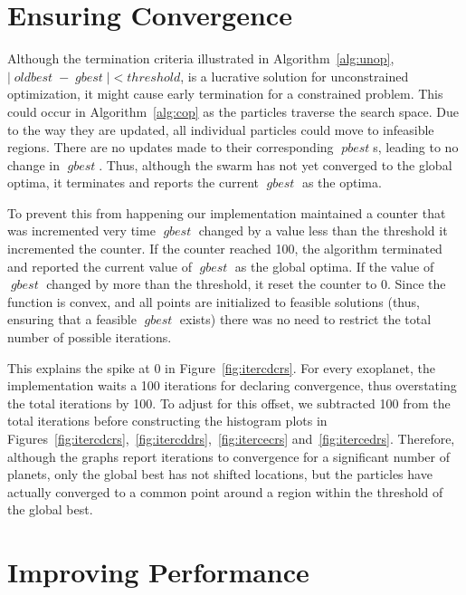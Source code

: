 \documentclass[10pt]{article}
\DeclareMathOperator*{\pbest}{\mathit{pbest}}
\DeclareMathOperator*{\gbest}{\mathit{gbest}}
\DeclareMathOperator*{\oldbest}{\mathit{oldbest}}
\begin{document}
\begin{appendices}

  \pagebreak
  \section{Ensuring Convergence}\label{app:con}

  Although the termination criteria illustrated in Algorithm~\ref{alg:unop}, $|\oldbest-\gbest| < \mathit{threshold}$,
  is a lucrative solution for unconstrained optimization, it might cause early termination for a constrained problem.
  This could occur in Algorithm~\ref{alg:cop} as the particles traverse the search space. Due to the way they are
  updated, all individual particles could move to infeasible regions. There are no updates made to their corresponding
  $\pbest$s, leading to no change in $\gbest$. Thus, although the swarm has not yet converged to the global optima, it
  terminates and reports the current $\gbest$ as the optima.

  To prevent this from happening our implementation maintained a counter that was incremented very time $\gbest$ changed
  by a value less than the threshold it incremented the counter. If the counter reached \num{100}, the algorithm
  terminated and reported the current value of $\gbest$ as the global optima. If the value of $\gbest$ changed by more
  than the threshold, it reset the counter to $\num{0}$. Since the function is convex, and all points are initialized to
  feasible solutions (thus, ensuring that a feasible $\gbest$ exists) there was no need to restrict the total number of
  possible iterations.

  This explains the spike at \num{0} in Figure~\ref{fig:itercdcrs}. For every exoplanet, the implementation waits a
  \num{100} iterations for declaring convergence, thus overstating the total iterations by \num{100}. To adjust for this
  offset, we subtracted \num{100} from the total iterations before constructing the histogram plots in
  Figures~\ref{fig:itercdcrs},~\ref{fig:itercddrs},~\ref{fig:itercecrs} and~\ref{fig:itercedrs}. Therefore, although the
  graphs report iterations to convergence for a significant number of planets, only the global best has not shifted
  locations, but the particles have actually converged to a common point around a region within the threshold of the
  global best.

  \section{Improving Performance}\label{app:imp}


\end{appendices}
\end{document}
